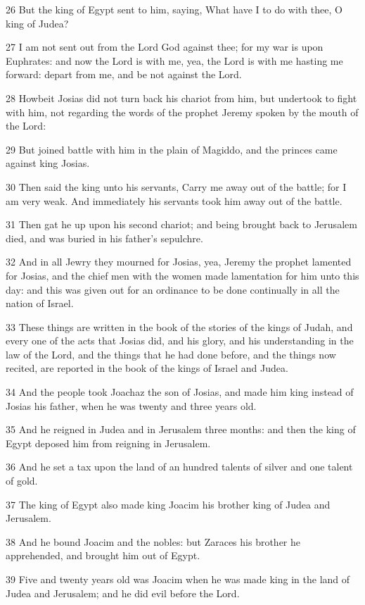 \par 26 But the king of Egypt sent to him, saying, What have I to do with thee, O king of Judea?
\par 27 I am not sent out from the Lord God against thee; for my war is upon Euphrates: and now the Lord is with me, yea, the Lord is with me hasting me forward: depart from me, and be not against the Lord.
\par 28 Howbeit Josias did not turn back his chariot from him, but undertook to fight with him, not regarding the words of the prophet Jeremy spoken by the mouth of the Lord:
\par 29 But joined battle with him in the plain of Magiddo, and the princes came against king Josias.
\par 30 Then said the king unto his servants, Carry me away out of the battle; for I am very weak. And immediately his servants took him away out of the battle.
\par 31 Then gat he up upon his second chariot; and being brought back to Jerusalem died, and was buried in his father's sepulchre.
\par 32 And in all Jewry they mourned for Josias, yea, Jeremy the prophet lamented for Josias, and the chief men with the women made lamentation for him unto this day: and this was given out for an ordinance to be done continually in all the nation of Israel.
\par 33 These things are written in the book of the stories of the kings of Judah, and every one of the acts that Josias did, and his glory, and his understanding in the law of the Lord, and the things that he had done before, and the things now recited, are reported in the book of the kings of Israel and Judea.
\par 34 And the people took Joachaz the son of Josias, and made him king instead of Josias his father, when he was twenty and three years old.
\par 35 And he reigned in Judea and in Jerusalem three months: and then the king of Egypt deposed him from reigning in Jerusalem.
\par 36 And he set a tax upon the land of an hundred talents of silver and one talent of gold.
\par 37 The king of Egypt also made king Joacim his brother king of Judea and Jerusalem.
\par 38 And he bound Joacim and the nobles: but Zaraces his brother he apprehended, and brought him out of Egypt.
\par 39 Five and twenty years old was Joacim when he was made king in the land of Judea and Jerusalem; and he did evil before the Lord.
